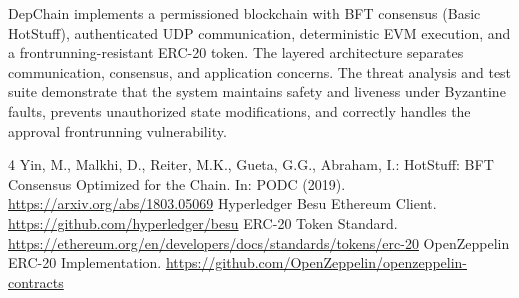 \documentclass{llncs}
\begin{document}
DepChain implements a permissioned blockchain with BFT consensus (Basic HotStuff), authenticated UDP communication, deterministic EVM execution, and a frontrunning-resistant ERC-20 token. The layered architecture separates communication, consensus, and application concerns. The threat analysis and test suite demonstrate that the system maintains safety and liveness under Byzantine faults, prevents unauthorized state modifications, and correctly handles the approval frontrunning vulnerability.

\begin{thebibliography}{4}
 Yin, M., Malkhi, D., Reiter, M.K., Gueta, G.G., Abraham, I.: HotStuff: BFT Consensus Optimized for the Chain. In: PODC (2019). \url{https://arxiv.org/abs/1803.05069}
 Hyperledger Besu Ethereum Client. \url{https://github.com/hyperledger/besu}
 ERC-20 Token Standard. \url{https://ethereum.org/en/developers/docs/standards/tokens/erc-20}
 OpenZeppelin ERC-20 Implementation. \url{https://github.com/OpenZeppelin/openzeppelin-contracts}
\end{thebibliography}
\end{document}
